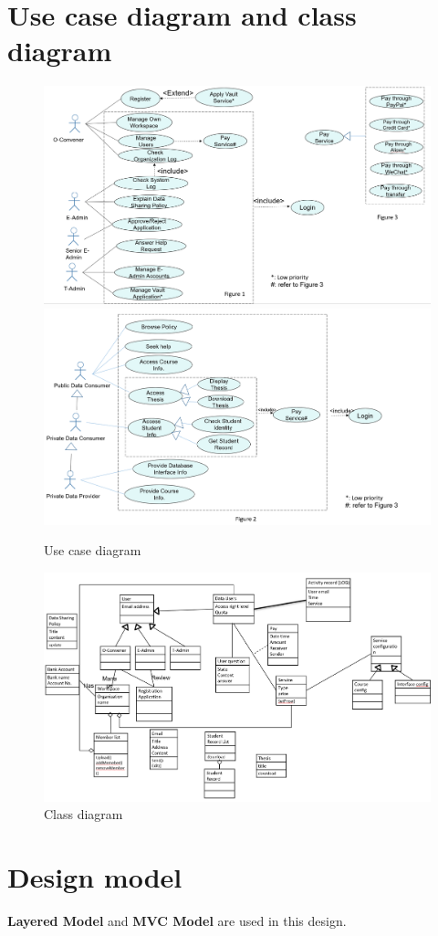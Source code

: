 \section{Use case diagram and class diagram}
\begin{figure}[H]
    \centering
    \includegraphics[width=0.75\linewidth]{picture/2-1/2-1-2.jpg}
    \includegraphics[width=0.75\linewidth]{picture/2-1/2-1-3.jpg}
    \caption{Use case diagram}
    \label{fig:enter-label}
\end{figure}

\begin{figure}[H]
    \centering
    \includegraphics[width=0.75\linewidth]{picture/2-1/2-1-1.jpg}
    \caption{Class diagram}
    \label{fig:enter-label}
\end{figure}


\section{Design model}
\textbf{Layered Model} and \textbf{MVC Model} are used in this design.

